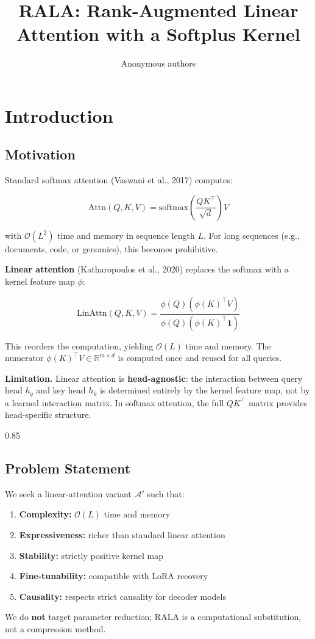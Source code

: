 \title{\textbf{RALA: Rank-Augmented Linear Attention with a Softplus Kernel}}

\author{Anonymous authors}



\section{Introduction}

\subsection{Motivation}

Standard softmax attention (Vaswani et al., 2017) computes:

\[
\text{Attn}(Q, K, V) = \text{softmax}\!\left(\frac{Q K^\top}{\sqrt{d}}\right) V
\tag{1.1}
\]

with $\mathcal{O}(L^2)$ time and memory in sequence length $L$. For long 
sequences (e.g., documents, code, or genomics), this becomes prohibitive.

\textbf{Linear attention} (Katharopoulos et al., 2020) replaces the softmax with 
a kernel feature map $\phi$:

\[
\text{LinAttn}(Q, K, V) = \frac{\phi(Q) \left(\phi(K)^\top V\right)}{\phi(Q) \left(\phi(K)^\top \mathbf{1}\right)}
\tag{1.2}
\]

This reorders the computation, yielding $\mathcal{O}(L)$ time and memory. 
The numerator $\phi(K)^\top V \in \mathbb{R}^{m \times d}$ is computed once 
and reused for all queries.

\textbf{Limitation.} Linear attention is \textbf{head-agnostic}: the interaction between 
query head $h_q$ and key head $h_k$ is determined entirely by the kernel 
feature map, not by a learned interaction matrix. In softmax attention, the 
full $QK^\top$ matrix provides head-specific structure.

0.85


\subsection{Problem Statement}

We seek a linear-attention variant $\mathcal{A}'$ such that:

\begin{enumerate}
\item \textbf{Complexity:} $\mathcal{O}(L)$ time and memory
\item \textbf{Expressiveness:} richer than standard linear attention
\item \textbf{Stability:} strictly positive kernel map
\item \textbf{Fine-tunability:} compatible with LoRA recovery
\item \textbf{Causality:} respects strict causality for decoder models

\end{enumerate}
We do \textbf{not} target parameter reduction; RALA is a computational substitution, 
not a compression method.

